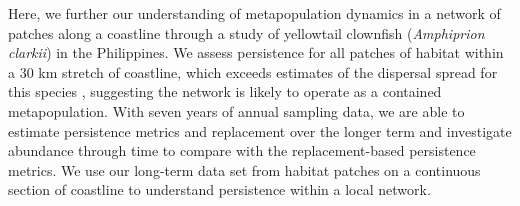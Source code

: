 \documentclass[12pt, oneside]{article}   	%
\begin{document}


Here, we further our understanding of metapopulation dynamics in a network of patches along a coastline through a study of yellowtail clownfish (\textit{Amphiprion clarkii}) in the Philippines. We assess persistence for all patches of habitat within a 30 km stretch of coastline, which exceeds estimates of the dispersal spread for this species \citep{pinsky2010using}, suggesting the network is likely to operate as a contained metapopulation. With seven years of annual sampling data, we are able to estimate persistence metrics and replacement over the longer term and investigate abundance through time to compare with the replacement-based persistence metrics. We use our long-term data set from habitat patches on a continuous section of coastline to understand persistence within a local network. %


\end{document}
